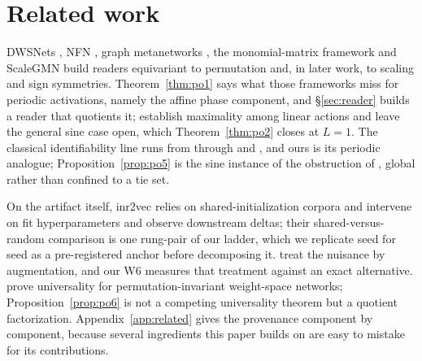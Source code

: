 \section{Related work}\label{sec:related}

DWSNets \citep{navon2023dws}, NFN \citep{zhou2023nfn}, graph metanetworks
\citep{lim2024gmn,kofinas2024graph}, the monomial-matrix framework \citep{tran2024monomial} and
ScaleGMN \citep{kalogeropoulos2024scalegmn} build readers equivariant to permutation and, in later
work, to scaling and sign symmetries. Theorem~\ref{thm:po1} says what those frameworks miss for
periodic activations, namely the affine phase component, and \S\ref{sec:reader} builds a reader that
quotients it; \citet{tran2024monomial} establish maximality among linear actions and leave the
general sine case open, which Theorem~\ref{thm:po2} closes at $L=1$. The classical identifiability
line runs from \citet{hechtnielsen1990algebraic} through \citet{sussmann1992uniqueness} and
\citet{fefferman1994reconstructing}, and ours is its periodic analogue;
Proposition~\ref{prop:po5} is the sine instance of the obstruction of
\citet{dym2024impossibility}, global rather than confined to a tie set.

On the artifact itself, inr2vec \citep{deluigi2023inr2vec} relies on shared-initialization corpora
and \citet{papa2024howtotrain} intervene on fit hyperparameters and observe downstream deltas; their
shared-versus-random comparison is one rung-pair of our ladder, which we replicate seed for seed as
a pre-registered anchor before decomposing it. \citet{shamsian2024augmentations} treat the nuisance
by augmentation, and our W6 measures that treatment against an exact alternative.
\citet{wsn2026expressivity} prove universality for permutation-invariant weight-space networks;
Proposition~\ref{prop:po6} is not a competing universality theorem but a quotient factorization.
Appendix~\ref{app:related} gives the provenance component by component, because several ingredients
this paper builds on are easy to mistake for its contributions.
